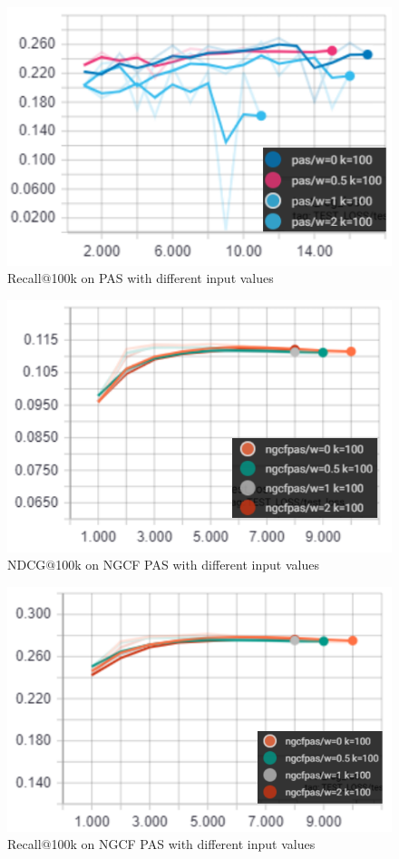 \begin{figure}
    \includegraphics[width=\linewidth]{figures/graphs/recall-pas-weights.png}
    \caption{Recall$@$100k on PAS with different input values}
    \label{fig:recall-pas-weights}
\end{figure}

\begin{figure}
    \includegraphics[width=\linewidth]{figures/graphs/ndcg100-ngcfpas-weights.png}
    \caption{NDCG$@$100k on NGCF PAS with different input values}
    \label{fig:ndcg-ngcfpas-weights}
\end{figure}

\begin{figure}
    \includegraphics[width=\linewidth]{figures/graphs/recall-ngcfpas-weights.png}
    \caption{Recall$@$100k on NGCF PAS with different input values}
    \label{fig:recall-ngcfpas-weights}
\end{figure}

